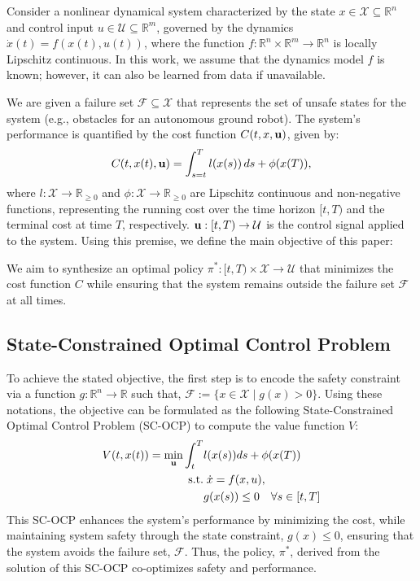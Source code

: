 Consider a nonlinear dynamical system characterized by the state $x \in \mathcal{X} \subseteq \mathbb{R}^n$ and control input $u \in \mathcal{U} \subseteq \mathbb{R}^m$, governed by the dynamics $\dot{x}(t) = f(x(t), u(t))$, where the function $f: \mathbb{R}^n \times \mathbb{R}^m \to \mathbb{R}^n$ is locally Lipschitz continuous.
In this work, we assume that the dynamics model $f$ is known; however, it can also be learned from data if unavailable.

We are given a failure set $\mathcal{F} \subseteq \mathcal{X}$ that represents the set of unsafe states for the system (e.g., obstacles for an autonomous ground robot). The system's performance is quantified by the cost function $C(t, x, \mathbf{u})$, given by: 
\begin{equation}
    C(t,x(t), \mathbf{u}) = \int_{s=t}^{T} l(x(s)) \, ds + \phi(x(T)),
\end{equation}
where $l: \mathcal{X} \to \mathbb{R}_{\geq 0}$ and $\phi: \mathcal{X} \to \mathbb{R}_{\geq 0}$ are Lipschitz continuous and non-negative functions, representing the running cost over the time horizon $[t, T)$ and the terminal cost at time $T$, respectively. 
$\mathbf{u}:[t,T)\rightarrow \mathcal{U}$ is the control signal applied to the system.
Using this premise, we define the main objective of this paper: 

\begin{objective}
\label{obj: Main_obj}
   We aim to synthesize an optimal policy $\pi^*: [t, T) \times \mathcal{X} \to \mathcal{U}$ that minimizes the cost function $C$ while ensuring that the system remains outside the failure set $\mathcal{F}$ at all times. 
\end{objective}


\subsection{State-Constrained Optimal Control Problem}
To achieve the stated objective, the first step is to encode the safety constraint via a function $g: \mathbb{R}^n \to \mathbb{R}$ such that, $\mathcal{F}:= \{x \in \mathcal{X} \mid g(x) > 0\}$. Using these notations, the objective can be formulated as the following State-Constrained Optimal Control Problem (SC-OCP) to compute the value function $V$:
\begin{equation}\label{eq: SC-OCP}
    \begin{aligned}
    V(t, x(t)) = \min_{\mathbf{u}}\int_t^{T}&l(x(s)) ds + \phi(x(T))\\
    \text{s.t.} & \; \dot{x} = f(x, u), \\
    & g(x(s)) \leq 0 \quad \forall s \in [t, T]
\end{aligned}
\end{equation}
This SC-OCP enhances the system's performance by minimizing the cost, while maintaining system safety through the state constraint, $g(x) \leq 0$, ensuring that the system avoids the failure set, $\mathcal{F}$. Thus, the policy, $\pi^*$, derived from the solution of this SC-OCP co-optimizes safety and performance. 

